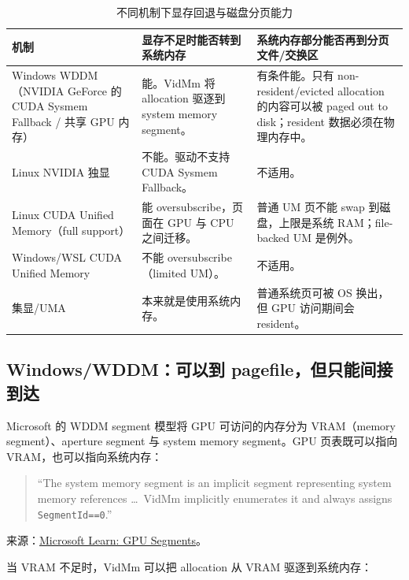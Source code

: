 \documentclass[a4paper, 12pt, linespread=1.35]{ctexart}   %
\begin{document}
\begin{table}[htbp]
  \centering
  \small
  \caption{不同机制下显存回退与磁盘分页能力}
  \label{tab:vram-fallback}
  \begin{tabular}{@{}p{}p{}p{}@{}}
    \toprule
    机制 & 显存不足时能否转到系统内存 & 系统内存部分能否再到分页文件/交换区 \\
    \midrule
    Windows WDDM（NVIDIA GeForce 的 CUDA Sysmem Fallback / 共享 GPU 内存）
      & 能。VidMm 将 allocation 驱逐到 system memory segment。
      & 有条件能。只有 non-resident/evicted allocation 的内容可以被 paged out to disk；resident 数据必须在物理内存中。 \\
    \addlinespace
    Linux NVIDIA 独显
      & 不能。驱动不支持 CUDA Sysmem Fallback。
      & 不适用。 \\
    \addlinespace
    Linux CUDA Unified Memory（full support）
      & 能 oversubscribe，页面在 GPU 与 CPU 之间迁移。
      & 普通 UM 页不能 swap 到磁盘，上限是系统 RAM；file-backed UM 是例外。 \\
    \addlinespace
    Windows/WSL CUDA Unified Memory
      & 不能 oversubscribe（limited UM）。
      & 不适用。 \\
    \addlinespace
    集显/UMA
      & 本来就是使用系统内存。
      & 普通系统页可被 OS 换出，但 GPU 访问期间会 resident。 \\
    \bottomrule
  \end{tabular}
\end{table}

\subsection{Windows/WDDM：可以到 pagefile，但只能间接到达}

Microsoft 的 WDDM segment 模型将 GPU 可访问的内存分为 VRAM（memory segment）、aperture segment 与 system memory segment。GPU 页表既可以指向 VRAM，也可以指向系统内存：

\begin{quote}
\small
``The system memory segment is an implicit segment representing system memory references \ldots\ VidMm implicitly enumerates it and always assigns \texttt{SegmentId==0}.''
\end{quote}

\noindent
来源：\href{https://learn.microsoft.com/en-us/windows-hardware/drivers/display/gpu-segments}{Microsoft Learn: GPU Segments}。

当 VRAM 不足时，VidMm 可以把 allocation 从 VRAM 驱逐到系统内存：
\end{document}
